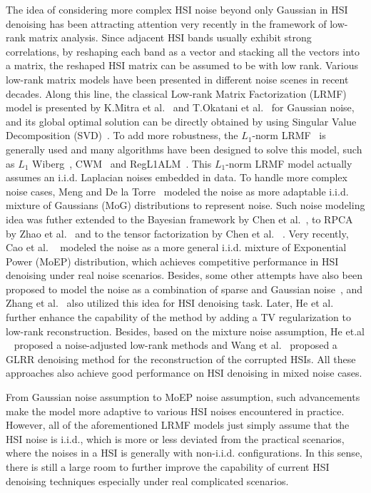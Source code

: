 \documentclass[journal]{IEEEtran}
\begin{document}
The idea of considering more complex HSI noise beyond only Gaussian in HSI denoising has been attracting attention very recently in the framework of low-rank matrix analysis. Since adjacent HSI bands usually exhibit strong correlations, by reshaping each band as a vector and stacking all the vectors into a matrix, the reshaped HSI matrix can be assumed to be with low rank. Various low-rank matrix models have been presented in different noise scenes in recent decades. Along this line, the classical Low-rank Matrix Factorization (LRMF) model is presented by K.Mitra et al.~\cite{okatani2011efficient} and T.Okatani et al.~\cite{mitra2010large} for Gaussian noise, and its global optimal solution can be directly obtained by using Singular Value Decomposition (SVD)~\cite{haardt1996method}. To add more robustness, the $L_ 1$-norm  LRMF~\cite{ding2006r,eriksson2010efficient,ji2010robust,ke2005robust} is generally used and many algorithms have been designed to solve this model, such as $L_1$ Wiberg~\cite{eriksson2010efficient}, CWM~\cite{meng2013cyclic} and RegL1ALM~\cite{zheng2012practical}. This $L_1$-norm LRMF model actually assumes an i.i.d. Laplacian noises embedded in data. To handle more complex noise cases, Meng and De la Torre~\cite{meng2013robust} modeled the noise as more adaptable i.i.d. mixture of Gaussians (MoG) distributions to represent noise. Such noise modeling idea was futher extended to the Bayesian framework by Chen et al.~\cite{chen2015bayesian}, to RPCA by Zhao et al.~\cite{zhao2014robust} and  to the tensor factorization by Chen et al.~\cite{han2016CVPR}  . Very recently, Cao et al. ~\cite{cao2015PMoEP,cao2016PMoEP} modeled the noise as a more general i.i.d. mixture of Exponential Power (MoEP) distribution, which achieves competitive performance in HSI denoising under real noise scenarios. Besides, some other attempts have also been proposed to model the noise as a combination of sparse and Gaussian noise~\cite{babacan2012sparse}, and Zhang et al.~\cite{zhang2014hyperspectral} also utilized this idea for HSI denoising task. Later, He et al.~\cite{hetotal} further enhance the capability of the method by adding a TV regularization to low-rank reconstruction. Besides, based on the mixture noise assumption, He et.al ~\cite{he2015hyperspectral} proposed a noise-adjusted low-rank methods and Wang et al.~\cite{wangdenoising} proposed a GLRR denoising method for the reconstruction of the corrupted HSIs. All these approaches also achieve good performance on HSI denoising in mixed noise cases.

From Gaussian noise assumption to MoEP noise assumption, such advancements make the model more adaptive to various HSI noises encountered in practice.  However, all of the aforementioned LRMF models just simply assume that the HSI noise is i.i.d., which is more or less deviated from the practical scenarios, where the noises in a HSI is generally with non-i.i.d. configurations. In this sense, there is still a large room to further improve the capability of current HSI denoising techniques especially under real complicated scenarios.
\end{document}
